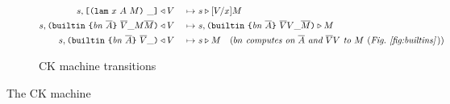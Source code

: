 \documentclass[../zerepoch-core-specification.tex]{subfiles}
\begin{document}
\begin{figure}[H]
\begin{subfigure}[c]{\linewidth}
\begin{minipage}{\linewidth}
\begin{alignat*}{2}
  s,\texttt{[} \texttt{(} \texttt{lam} ~ x ~ A ~ M \texttt{)} ~ \_ \texttt{]} &\triangleleft V
                                            &~\mapsto~&  s \triangleright [V/x]M\\
  s,\texttt{(} \texttt{builtin} ~ \texttt{\{} \mathit{bn} ~ \overline{A} \texttt{\}} ~ \overline{V} \_ M \overline{M} \texttt{)} & \triangleleft V
                                            &~\mapsto~& s,\texttt{(} \texttt{builtin} ~ \texttt{\{} \mathit{bn} ~ \overline{A} \texttt{\}} ~ \overline{V} V \_ \overline{M} \texttt{)} \triangleright M\\
  s,\texttt{(} \texttt{builtin} ~ \texttt{\{} \mathit{bn} ~ \overline{A} \texttt{\}} ~ \overline{V} \_  \texttt{)} &\triangleleft V
                                            &~\mapsto~& s \triangleright M
                                              \quad (\textit{$bn$ computes on $\overline{A}$ and $\overline{V}V$
                                              to $M$ \textup{(}Fig.~\ref{fig:builtins}\,\textup{)}})\\
    \end{alignat*}
\end{minipage}
    \caption{CK machine transitions}
    \label{fig:typed-ck-transitions}
\end{subfigure}
\caption{The CK machine}
\label{fig:typed-ck-machine}
\end{figure}
\end{document}
